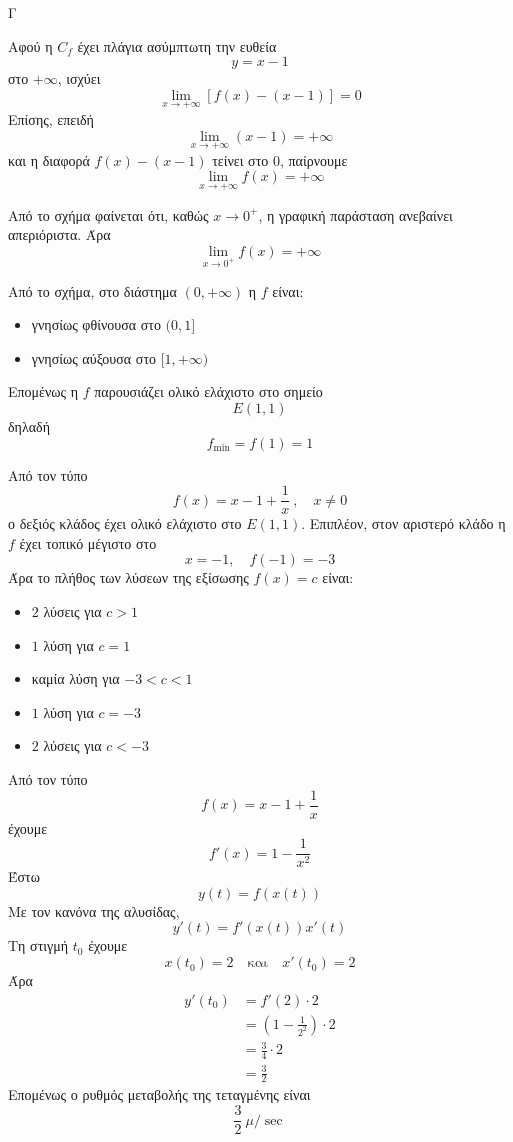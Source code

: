 
\begin{thema}{Γ}
\begin{erwthma}
\item Αφού η $C_f$ έχει πλάγια ασύμπτωτη την ευθεία
\[
y=x-1
\]
στο $+\infty$, ισχύει
\[
\lim\limits_{x\to+\infty}\left[f(x)-(x-1)\right]=0
\]
Επίσης, επειδή
\[
\lim\limits_{x\to+\infty}(x-1)=+\infty
\]
και η διαφορά $f(x)-(x-1)$ τείνει στο $0$, παίρνουμε
\[
\lim\limits_{x\to+\infty}f(x)=+\infty
\]

Από το σχήμα φαίνεται ότι, καθώς $x\to 0^+$, η γραφική παράσταση ανεβαίνει απεριόριστα.
Άρα
\[
\lim\limits_{x\to0^+}f(x)=+\infty
\]

\item Από το σχήμα, στο διάστημα $(0,+\infty)$ η $f$ είναι:
\begin{itemize}
\item γνησίως φθίνουσα στο $(0,1]$
\item γνησίως αύξουσα στο $[1,+\infty)$
\end{itemize}
Επομένως η $f$ παρουσιάζει ολικό ελάχιστο στο σημείο
\[
E(1,1)
\]
δηλαδή
\[
f_{\min}=f(1)=1
\]

\item Από τον τύπο
\[
f(x)=x-1+\frac{1}{x}\ ,\quad x\neq 0
\]
ο δεξιός κλάδος έχει ολικό ελάχιστο στο $E(1,1)$.
Επιπλέον, στον αριστερό κλάδο η $f$ έχει τοπικό μέγιστο στο
\[
x=-1,\quad f(-1)=-3
\]
Άρα το πλήθος των λύσεων της εξίσωσης $f(x)=c$ είναι:
\begin{itemize}
\item $2$ λύσεις για $c>1$
\item $1$ λύση για $c=1$
\item καμία λύση για $-3<c<1$
\item $1$ λύση για $c=-3$
\item $2$ λύσεις για $c<-3$
\end{itemize}

\item Από τον τύπο
\[
f(x)=x-1+\frac{1}{x}
\]
έχουμε
\[
f'(x)=1-\frac{1}{x^2}
\]
Έστω
\[
y(t)=f(x(t))
\]
Με τον κανόνα της αλυσίδας,
\[
y'(t)=f'(x(t))x'(t)
\]
Τη στιγμή $t_0$ έχουμε
\[
x(t_0)=2
\quad \text{και}\quad
x'(t_0)=2
\]
Άρα
\begin{align*}
y'(t_0)
&=f'(2)\cdot 2\\
&=\left(1-\frac{1}{2^2}\right)\cdot 2\\
&=\frac{3}{4}\cdot 2\\
&=\frac{3}{2}
\end{align*}
Επομένως ο ρυθμός μεταβολής της τεταγμένης είναι
\[
\frac{3}{2}\ \mu/\sec
\]
\end{erwthma}
\end{thema}

